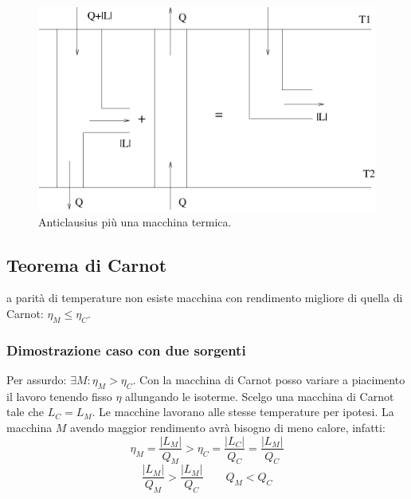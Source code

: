 \begin{figure}[htbp]
   \centering
   \includegraphics[scale=0.5]{immagini/fisica1/AC+Carnot}
   \caption{Anticlausius più una macchina termica.}
   \label{CK2}
\end{figure}

\subsection{Teorema di Carnot}
\begin{Teo}
   a parità di temperature non esiste macchina con rendimento migliore di quella di Carnot: $\eta_M\leq\eta_C$.
\end{Teo}
\subsubsection{Dimostrazione caso con due sorgenti}
Per assurdo: $\exists M: \eta_M>\eta_C$. Con la macchina di Carnot posso variare a piacimento il lavoro tenendo fisso $\eta$ allungando le isoterme. Scelgo una macchina di Carnot tale che $L_C=L_M$. Le macchine lavorano alle stesse temperature per ipotesi. La macchina $M$ avendo maggior rendimento avrà bisogno di meno calore, infatti:
\[\eta_M=\frac{|L_M|}{Q_M}>\eta_C=\frac{|L_C|}{Q_C}=\frac{|L_M|}{Q_C}\]
\[\frac{|L_M|}{Q_M}>\frac{|L_M|}{Q_C} \qquad Q_M<Q_C\]

